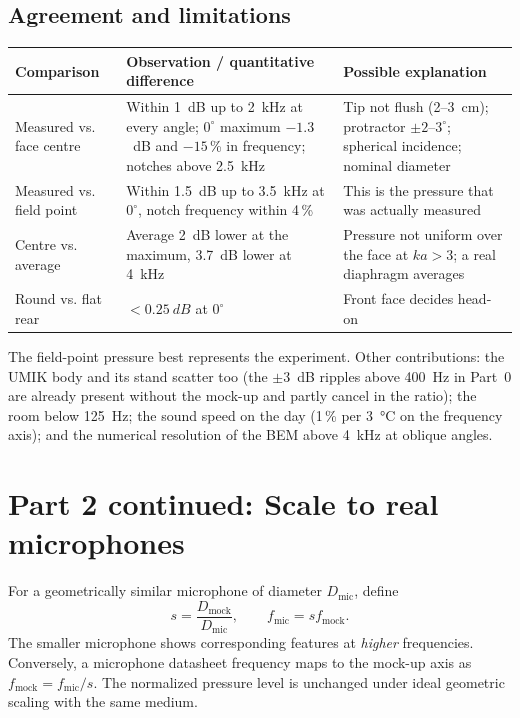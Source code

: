 \documentclass[a4paper,10pt]{article}
\begin{document}
\subsection{Agreement and limitations}
\par\smallskip
\begin{tabularx}{\linewidth}{@{}lXX@{}}\toprule
Comparison & Observation / quantitative difference & Possible explanation \\\midrule
Measured vs. face centre & Within \SI{1}{dB} up to \SI{2}{kHz} at every angle; $0^\circ$ maximum $-1.3$~dB and $-15$\,\% in frequency; notches above \SI{2.5}{kHz} & Tip not flush (2--\SI{3}{cm}); protractor $\pm2$--$3^\circ$; spherical incidence; nominal diameter \\
Measured vs. field point & Within \SI{1.5}{dB} up to \SI{3.5}{kHz} at $0^\circ$, notch frequency within 4\,\% & This is the pressure that was actually measured \\
Centre vs. average & Average \SI{2}{dB} lower at the maximum, \SI{3.7}{dB} lower at \SI{4}{kHz} & Pressure not uniform over the face at $ka>3$; a real diaphragm averages \\
Round vs. flat rear & $<\SI{0.25}{dB}$ at $0^\circ$ & Front face decides head-on \\\bottomrule
\end{tabularx}\par\smallskip
The field-point pressure best represents the experiment. Other contributions: the
UMIK body and its stand scatter too (the $\pm3$~dB ripples above \SI{400}{Hz} in Part~0
are already present without the mock-up and partly cancel in the ratio); the room below
\SI{125}{Hz}; the sound speed on the day (1\,\% per \SI{3}{\celsius} on the frequency
axis); and the numerical resolution of the BEM above \SI{4}{kHz} at oblique angles.

\newpage
\section{Part 2 continued: Scale to real microphones}
For a geometrically similar microphone of diameter $D_{\mathrm{mic}}$, define
\begin{equation}
s=\frac{D_{\mathrm{mock}}}{D_{\mathrm{mic}}},\qquad
f_{\mathrm{mic}}=s f_{\mathrm{mock}}.
\end{equation}
The smaller microphone shows corresponding features at \emph{higher} frequencies.
Conversely, a microphone datasheet frequency maps to the mock-up axis as
$f_{\mathrm{mock}}=f_{\mathrm{mic}}/s$. The normalized pressure level is unchanged
under ideal geometric scaling with the same medium.
\end{document}
